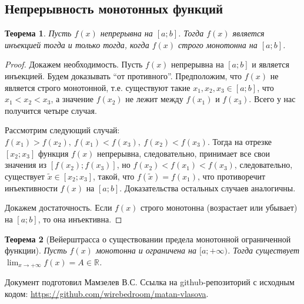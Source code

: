 \documentclass[a4paper,12pt]{article} %
\newtheorem{theorem}{Теорема}[section]
\theoremstyle{remark}
\theoremstyle{definition}
\begin{document}
\subsection{Непрерывность монотонных функций}
\begin{theorem}
    Пусть $f(x)$ непрерывна на $[a; b]$. Тогда $f(x)$ является инъекцией тогда и только тогда, когда $f(x)$ строго монотонна на $[a; b]$.
\end{theorem}
\begin{proof}
    Докажем необходимость. Пусть $f(x)$ непрерывна на $[a; b]$ и является инъекцией. Будем доказывать ``от противного''. Предположим, что $f(x)$ не является строго монотонной, т.е. существуют такие $x_1, x_2, x_3 \in [a; b]$, что $x_1 < x_2 < x_3$, а значение $f(x_2)$ не лежит между $f(x_1)$ и $f(x_3)$. Всего у нас получится четыре случая.

    Рассмотрим следующий случай: $f(x_1) > f(x_2), \ f(x_1) < f(x_3), \ f(x_2) < f(x_3)$. Тогда на отрезке $[x_2; x_3]$ функция $f(x)$ непрерывна, следовательно, принимает все свои значения из $[f(x_2); f(x_3)]$, но $f(x_2) < f(x_1) < f(x_3)$, следовательно, существует $\widetilde{x} \in [x_2; x_3]$, такой, что $f(\widetilde{x}) = f(x_1)$, что противоречит инъективности $f(x)$ на $[a; b]$. Доказательства остальных случаев аналогичны.

    Докажем достаточность. Если $f(x)$ строго монотонна (возрастает или убывает) на $[a; b]$, то она инъективна.
\end{proof}

\begin{theorem}[Вейерштрасса о существовании предела монотонной ограниченной функции]
    Пусть $f(x)$ монотонна и ограничена на $[a; +\infty)$. Тогда существует $\displaystyle \lim_{x \to +\infty} f(x) = A \in \mathbb{R}$.
\end{theorem}



\newpage
Документ подготовил Мамзелев В.С.
Ссылка на github-репозиторий с исходным кодом: \url{https://github.com/wirebedroom/matan-vlasova}.
\end{document}
